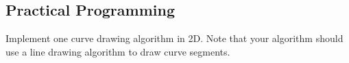 \documentclass{supervision}
\begin{document}
\begin{questions}
    \section*{Practical Programming}
    \question Implement one curve drawing algorithm in 2D. Note that your
      algorithm should use a line drawing algorithm to draw curve segments.
      \begin{solution}
      \end{solution}
  \end{questions}
\end{document}
